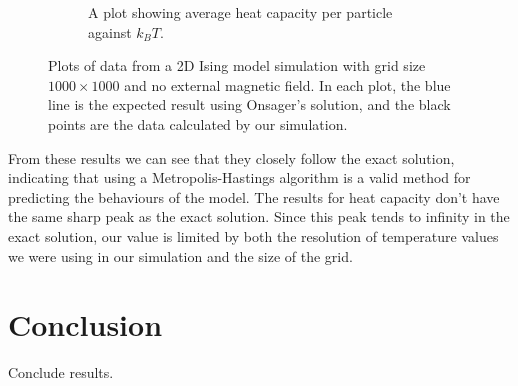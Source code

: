 \documentclass[11pt]{article}
\begin{document}
\begin{figure}[H]
\begin{subfigure}{0.45\textwidth}
\begin{center}
			\end{center}
			\caption{A plot showing average heat capacity per particle against $k_BT$.}
		\end{subfigure}
	
		\caption{Plots of data from a 2D Ising model simulation with grid size $1000 \times 1000$ and no external magnetic field. In each plot, the blue line is the expected result using Onsager's solution, and the black points are the data calculated by our simulation.}
		\label{fig:2d_1000_result}
	\end{figure}
	
	From these results we can see that they closely follow the exact solution, indicating that using a Metropolis-Hastings algorithm is a valid method for predicting the behaviours of the model. The results for heat capacity don't have the same sharp peak as the exact solution. Since this peak tends to infinity in the exact solution, our value is limited by both the resolution of temperature values we were using in our simulation and the size of the grid.
	
	\section{Conclusion}
	
	Conclude results.
	
	\newpage
	 
	
\end{document}

